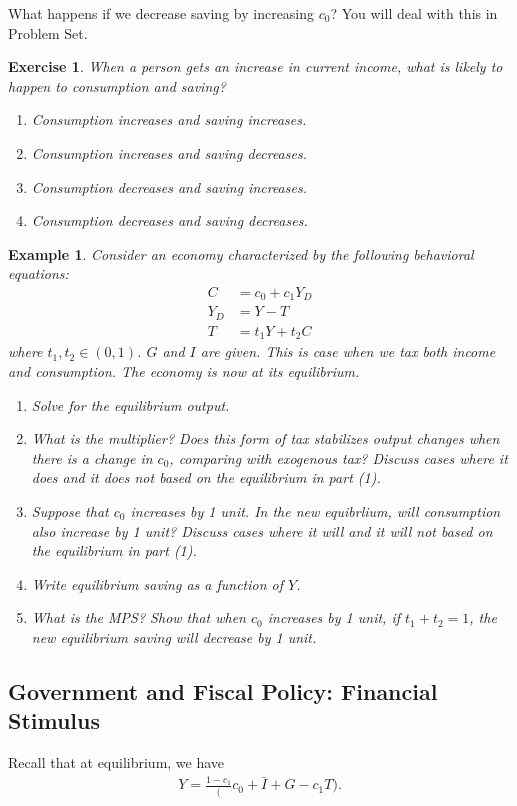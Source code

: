 \documentclass[12pt]{article}
\newtheorem{example}{Example}
\newtheorem{exercise}{Exercise}
\begin{document}
What happens if we decrease saving by increasing $c_0$? You will deal with this in Problem Set.

\begin{exercise}
    When a person gets an increase in current income, what is likely to happen to consumption and saving?
    \begin{enumerate}[label=\Alph*.]
        \item Consumption increases and saving increases.
        \item Consumption increases and saving decreases.
        \item Consumption decreases and saving increases.
        \item Consumption decreases and saving decreases.
    \end{enumerate}
\end{exercise}

\begin{example}
    Consider an economy characterized by the following behavioral equations:
    \begin{align*}
        C &= c_0 + c_1 Y_D\\
        Y_D &= Y - T\\
        T &= t_1 Y + t_2 C
    \end{align*}
    where $t_1, t_2 \in (0,1)$. $G$ and $I$ are given. This is case when we tax both income and consumption. The economy is now at its equilibrium.
    \begin{enumerate}[label=(\arabic*)]
        \item Solve for the equilibrium output.
        \item What is the multiplier? Does this form of tax stabilizes output changes when there is a change in $c_0$, comparing with exogenous tax? Discuss cases where it does and it does not based on the equilibrium in part (1).
        \item Suppose that $c_0$ increases by 1 unit. In the new equibrlium, will consumption also increase by 1 unit? Discuss cases where it will and it will not based on the equilibrium in part (1).
        \item Write equilibrium saving as a function of $Y$.
        \item What is the MPS? Show that when $c_0$ increases by 1 unit, if $t_1+t_2=1$, the new equilibrium saving will decrease by 1 unit.
    \end{enumerate} 
\end{example}

\subsection*{Government and Fiscal Policy: Financial Stimulus}
Recall that at equilibrium, we have
\begin{align*}
    Y = \frac{1-c_1}(c_0 + \bar{I} + G - c_1T).
\end{align*}
\end{document}
